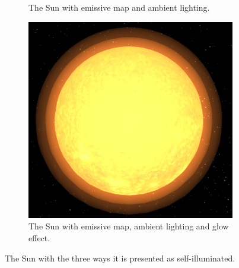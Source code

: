\documentclass[12pt]{article}
\begin{document}
\begin{figure}[H]
\begin{subfigure}[b]{0.4\textwidth}
                \caption{The Sun with emissive map and ambient lighting.}
                \label{fig:Self-illuminating Sun with emissive map.}
       \end{subfigure}
        \begin{subfigure}[b]{0.4\textwidth}
                \includegraphics[width=\textwidth]{images/sunwithglow}
                \caption{The Sun with emissive map, ambient lighting and glow effect.}
                \label{fig:Self-illuminating Sun with emissive map.}
       \end{subfigure}
        \caption{The Sun with the three ways it is presented as self-illuminated.}\label{fig:Self-illuminated Sun}
\end{figure}
\end{document}
